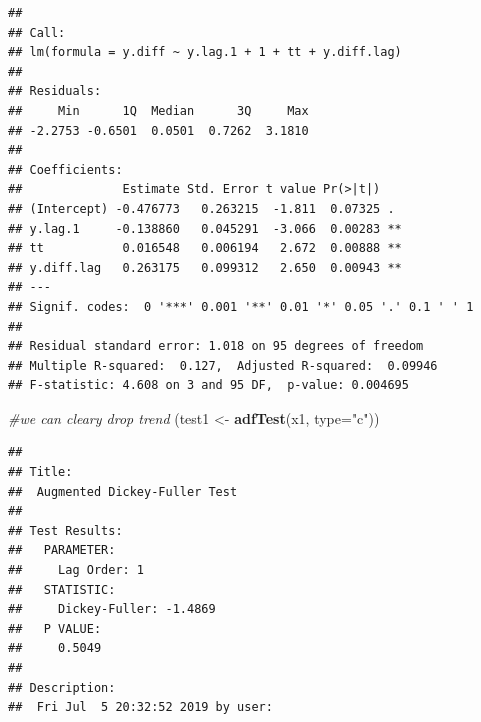 \documentclass[]{book}
\newenvironment{Shaded}{\begin{snugshade}}{\end{snugshade}}
\newcommand{\CommentTok}[1]{\textcolor[rgb]{0.56,0.35,0.01}{\textit{#1}}}
\newcommand{\DataTypeTok}[1]{\textcolor[rgb]{0.13,0.29,0.53}{#1}}
\newcommand{\KeywordTok}[1]{\textcolor[rgb]{0.13,0.29,0.53}{\textbf{#1}}}
\newcommand{\NormalTok}[1]{#1}
\newcommand{\OperatorTok}[1]{\textcolor[rgb]{0.81,0.36,0.00}{\textbf{#1}}}
\newcommand{\StringTok}[1]{\textcolor[rgb]{0.31,0.60,0.02}{#1}}
\begin{document}
\begin{Shaded}
\end{Shaded}

\begin{verbatim}
## 
## Call:
## lm(formula = y.diff ~ y.lag.1 + 1 + tt + y.diff.lag)
## 
## Residuals:
##     Min      1Q  Median      3Q     Max 
## -2.2753 -0.6501  0.0501  0.7262  3.1810 
## 
## Coefficients:
##              Estimate Std. Error t value Pr(>|t|)   
## (Intercept) -0.476773   0.263215  -1.811  0.07325 . 
## y.lag.1     -0.138860   0.045291  -3.066  0.00283 **
## tt           0.016548   0.006194   2.672  0.00888 **
## y.diff.lag   0.263175   0.099312   2.650  0.00943 **
## ---
## Signif. codes:  0 '***' 0.001 '**' 0.01 '*' 0.05 '.' 0.1 ' ' 1
## 
## Residual standard error: 1.018 on 95 degrees of freedom
## Multiple R-squared:  0.127,  Adjusted R-squared:  0.09946 
## F-statistic: 4.608 on 3 and 95 DF,  p-value: 0.004695
\end{verbatim}

\begin{Shaded}
\begin{Highlighting}[]
\CommentTok{#we can cleary drop trend}
\NormalTok{(test1 <-}\StringTok{ }\KeywordTok{adfTest}\NormalTok{(x1, }\DataTypeTok{type=}\StringTok{"c"}\NormalTok{))}
\end{Highlighting}
\end{Shaded}

\begin{verbatim}
## 
## Title:
##  Augmented Dickey-Fuller Test
## 
## Test Results:
##   PARAMETER:
##     Lag Order: 1
##   STATISTIC:
##     Dickey-Fuller: -1.4869
##   P VALUE:
##     0.5049 
## 
## Description:
##  Fri Jul  5 20:32:52 2019 by user:
\end{verbatim}

\begin{Shaded}
\end{Shaded}
\end{document}
